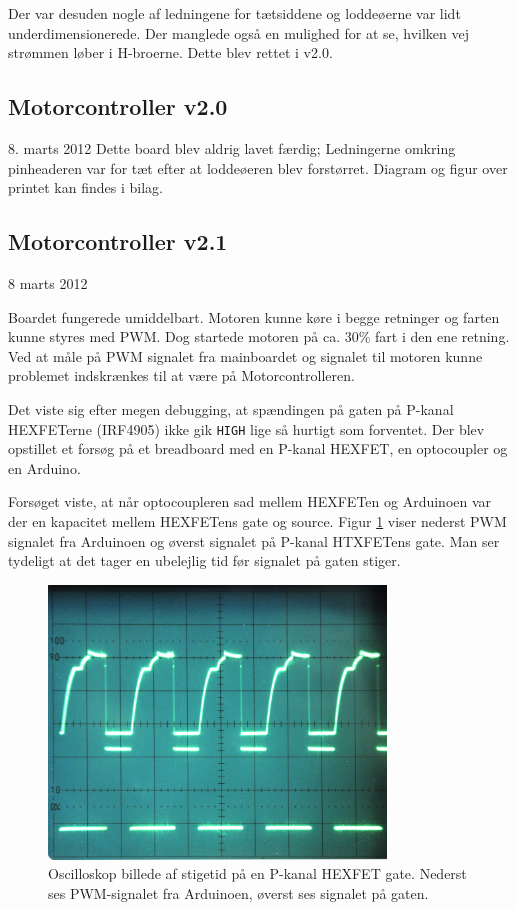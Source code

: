 \documentclass[a4paper,twoside,article,danish,table]{memoir}
\newcommand{\boarddate}[1]{\textcolor{blue!80!black}{#1}}
\begin{document}
Der var desuden nogle af ledningene for tætsiddene og loddeøerne var lidt underdimensionerede. Der manglede også en mulighed for at se, hvilken vej strømmen løber i H-broerne. Dette blev rettet i v2.0.
\subsection{Motorcontroller v2.0}
\boarddate{8. marts 2012} Dette board blev aldrig lavet færdig; Ledningerne omkring pinheaderen var for tæt efter at loddeøeren blev forstørret. Diagram og figur over printet kan findes i bilag. 

\subsection{Motorcontroller v2.1}
\boarddate{8 marts 2012}


Boardet fungerede umiddelbart. Motoren kunne køre i begge retninger og farten kunne styres med PWM. Dog startede motoren på ca. 30\% fart i den ene retning. Ved at måle på PWM signalet fra mainboardet og signalet til motoren kunne problemet indskrænkes til at være på Motorcontrolleren.

Det viste sig efter megen debugging, at spændingen på gaten på P-kanal HEXFETerne (IRF4905) ikke gik \texttt{HIGH} lige så hurtigt som forventet. Der blev opstillet et forsøg på et breadboard med en P-kanal HEXFET, en optocoupler og en Arduino.


Forsøget viste, at når optocoupleren sad mellem HEXFETen og Arduinoen var der en kapacitet mellem HEXFETens gate og source. Figur \ref{fig:stigetid} viser nederst PWM signalet fra Arduinoen og øverst signalet på P-kanal HTXFETens gate. Man ser tydeligt at det tager en ubelejlig tid før signalet på gaten stiger.
\begin{figure}[htbp]
  \centering
  \includegraphics[width=0.8\textwidth]{pictures/stigetid.jpg}
  \caption[Oscilloskop billede af stigetid på en P-kanal HEXFET gate]{Oscilloskop billede af stigetid på en P-kanal HEXFET gate. Nederst ses PWM-signalet fra Arduinoen, øverst ses signalet på gaten.}
  \label{fig:stigetid}
\end{figure}
\end{document}
